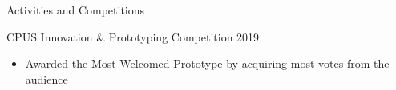 \documentclass{article}
\newlength{\tabin}
\newlength{\secsep}
\newcommand{\lineunder}{\vspace*{-8pt} \\ \hspace*{-6pt} \hrulefill \\ \vspace*{-15pt}}
\newenvironment{tabbedsection}[1]{
  \begin{list}{}{
      \setlength{\itemsep}{0pt}
      \setlength{\labelsep}{0pt}
      \setlength{\labelwidth}{0pt}
      \setlength{\leftmargin}{\tabin}
      \setlength{\rightmargin}{\tabin}
      \setlength{\listparindent}{0pt}
      \setlength{\parsep}{0pt}
      \setlength{\parskip}{0pt}
      \setlength{\partopsep}{0pt}
      \setlength{\topsep}{#1}
    }
  \item[]
}{\end{list}}
\newenvironment{resume_section}[1]{
  \filbreak
  \vspace{2\secsep}
  \textsc{\large#1}
  \lineunder
  \begin{tabbedsection}{\secsep}
}{\end{tabbedsection}}
\newenvironment{resume_subsection}[2][]{
  \textbf{#2} \hfill {\footnotesize #1} \hspace{2em}
  \begin{tabbedsection}{0.5\secsep}
}{\end{tabbedsection}}
\newenvironment{subitems}{
  \renewcommand{\labelitemi}{-}
  \begin{itemize}
      \setlength{\labelsep}{1em}
}{\end{itemize}}
\begin{document}
\begin{resume_section}{Activities and Competitions}


  \begin{resume_subsection}[(March 2019)]{CPUS Innovation \& Prototyping Competition 2019}
    \begin{subitems}
      \item Awarded the Most Welcomed Prototype by acquiring most votes from the audience
    \end{subitems}
  \end{resume_subsection}
\end{resume_section}
\end{document}
